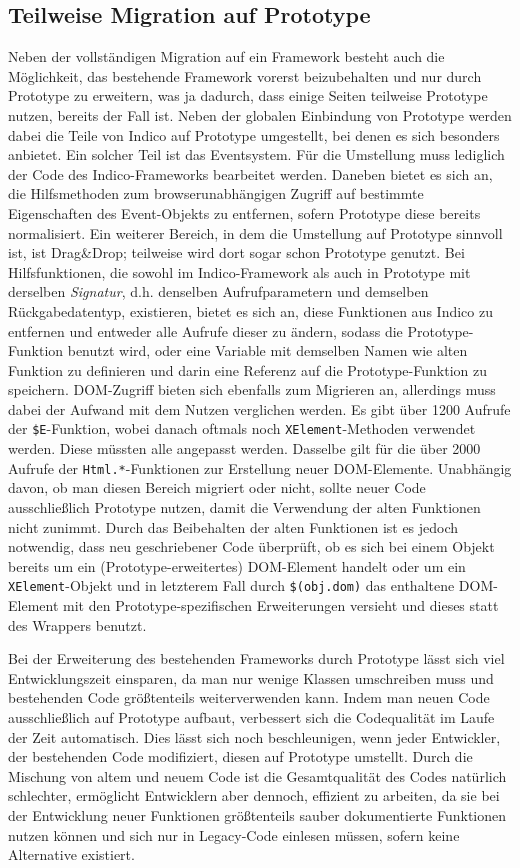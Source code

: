 \subsection{Teilweise Migration auf Prototype}
Neben der vollständigen Migration auf ein Framework besteht auch die Möglichkeit, das bestehende
Framework vorerst beizubehalten und nur durch Prototype zu erweitern, was ja dadurch, dass einige
Seiten teilweise Prototype nutzen, bereits der Fall ist. Neben der globalen Einbindung von Prototype
werden dabei die Teile von Indico auf Prototype umgestellt, bei denen es sich besonders anbietet. Ein
solcher Teil ist das Eventsystem. Für die Umstellung muss lediglich der Code des Indico-Frameworks
bearbeitet werden. Daneben bietet es sich an, die Hilfsmethoden zum browserunabhängigen Zugriff auf
bestimmte Eigenschaften des Event-Objekts zu entfernen, sofern Prototype diese bereits normalisiert.
Ein weiterer Bereich, in dem die Umstellung auf Prototype sinnvoll ist, ist Drag\&Drop; teilweise
wird dort sogar schon Prototype genutzt. Bei Hilfsfunktionen, die sowohl im Indico-Framework als
auch in Prototype mit derselben \emph{Signatur}, d.h. denselben Aufrufparametern und demselben
Rückgabedatentyp, existieren, bietet es sich an, diese Funktionen aus Indico zu entfernen und
entweder alle Aufrufe dieser zu ändern, sodass die Prototype-Funktion benutzt wird, oder eine
Variable mit demselben Namen wie alten Funktion zu definieren und darin eine Referenz auf die
Prototype-Funktion zu speichern. DOM-Zugriff bieten sich ebenfalls zum Migrieren an, allerdings muss
dabei der Aufwand mit dem Nutzen verglichen werden. Es gibt über 1200 Aufrufe der
\lstinline{$E}-Funktion, wobei danach oftmals noch \lstinline{XElement}-Methoden verwendet werden.
Diese müssten alle angepasst werden. Dasselbe gilt für die über 2000 Aufrufe der
\lstinline{Html.*}-Funktionen zur Erstellung neuer DOM-Elemente. Unabhängig davon, ob man diesen
Bereich migriert oder nicht, sollte neuer Code ausschließlich Prototype nutzen, damit die Verwendung
der alten Funktionen nicht zunimmt. Durch das Beibehalten der alten Funktionen ist es jedoch
notwendig, dass neu geschriebener Code überprüft, ob es sich bei einem Objekt bereits um ein
(Prototype-erweitertes) DOM-Element handelt oder um ein \lstinline{XElement}-Objekt und in letzterem
Fall durch \lstinline{$(obj.dom)} das enthaltene DOM-Element mit den Prototype-spezifischen
Erweiterungen versieht und dieses statt des Wrappers benutzt.

Bei der Erweiterung des bestehenden Frameworks durch Prototype lässt sich viel Entwicklungszeit
einsparen, da man nur wenige Klassen umschreiben muss und bestehenden Code größtenteils
weiterverwenden kann. Indem man neuen Code ausschließlich auf Prototype aufbaut, verbessert sich die
Codequalität im Laufe der Zeit automatisch. Dies lässt sich noch beschleunigen, wenn jeder
Entwickler, der bestehenden Code modifiziert, diesen auf Prototype umstellt. Durch die Mischung von
altem und neuem Code ist die Gesamtqualität des Codes natürlich schlechter, ermöglicht Entwicklern
aber dennoch, effizient zu arbeiten, da sie bei der Entwicklung neuer Funktionen größtenteils sauber
dokumentierte Funktionen nutzen können und sich nur in Legacy-Code einlesen müssen, sofern keine
Alternative existiert.


